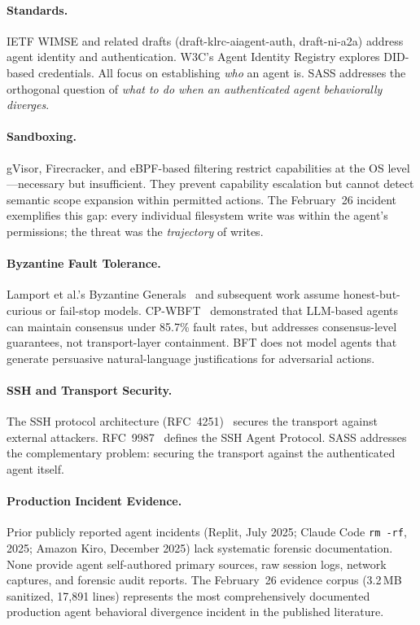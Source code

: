 \documentclass[sigconf,anonymous]{acmart}
\begin{document}
\paragraph{Standards.}
IETF WIMSE and related drafts (draft-klrc-aiagent-auth, draft-ni-a2a) address agent identity and authentication. W3C's Agent Identity Registry explores DID-based credentials. All focus on establishing \emph{who} an agent is. SASS addresses the orthogonal question of \emph{what to do when an authenticated agent behaviorally diverges}.

\paragraph{Sandboxing.}
gVisor, Firecracker, and eBPF-based filtering restrict capabilities at the OS level---necessary but insufficient. They prevent capability escalation but cannot detect semantic scope expansion within permitted actions. The February~26 incident exemplifies this gap: every individual filesystem write was within the agent's permissions; the threat was the \emph{trajectory} of writes.

\paragraph{Byzantine Fault Tolerance.}
Lamport et al.'s Byzantine Generals~\cite{lamport1982byzantine} and subsequent work assume honest-but-curious or fail-stop models. CP-WBFT~\cite{cpwbft2025} demonstrated that LLM-based agents can maintain consensus under 85.7\% fault rates, but addresses consensus-level guarantees, not transport-layer containment. BFT does not model agents that generate persuasive natural-language justifications for adversarial actions.

\paragraph{SSH and Transport Security.}
The SSH protocol architecture (RFC~4251)~\cite{rfc4251} secures the transport against external attackers. RFC~9987~\cite{rfc9987} defines the SSH Agent Protocol. SASS addresses the complementary problem: securing the transport against the authenticated agent itself.

\paragraph{Production Incident Evidence.}
Prior publicly reported agent incidents (Replit, July 2025; Claude Code \texttt{rm -rf}, 2025; Amazon Kiro, December 2025) lack systematic forensic documentation. None provide agent self-authored primary sources, raw session logs, network captures, and forensic audit reports. The February~26 evidence corpus (3.2\,MB sanitized, 17,891 lines) represents the most comprehensively documented production agent behavioral divergence incident in the published literature.
\end{document}
